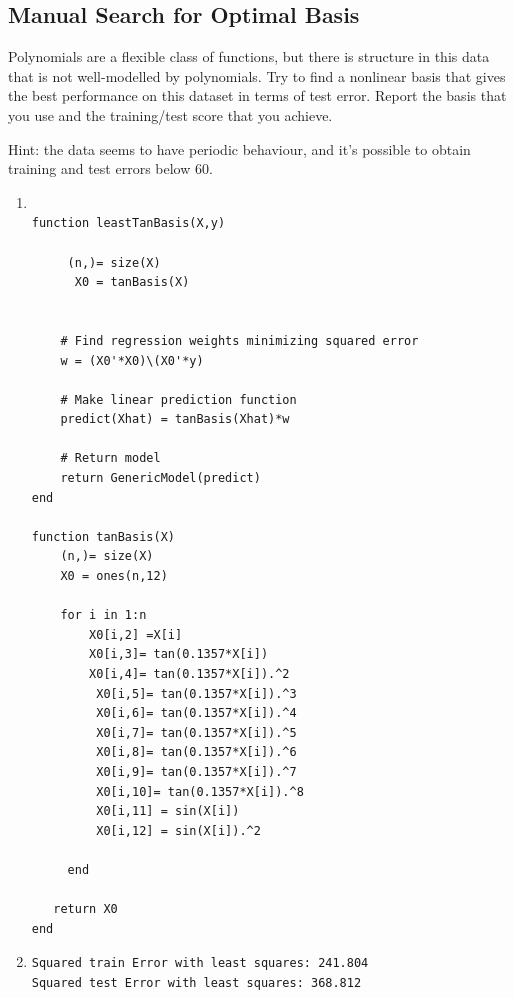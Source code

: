 \documentclass{article}
\def\blu#1{{\color{blu}#1}}
\begin{document}
\subsection{Manual Search for Optimal Basis}

Polynomials are a flexible class of functions, but there is structure in this data that is not well-modelled by polynomials. Try to find a nonlinear basis that gives the best performance on this dataset in terms of test error. \blu{Report the basis that you use and the training/test score that you achieve}.

Hint: the data seems to have periodic behaviour, and it's possible to obtain training and test errors below 60.

\begin{enumerate}
\item
 \begin{verbatim}

function leastTanBasis(X,y)

     (n,)= size(X)
      X0 = tanBasis(X)


    # Find regression weights minimizing squared error
    w = (X0'*X0)\(X0'*y)

    # Make linear prediction function
    predict(Xhat) = tanBasis(Xhat)*w

    # Return model
    return GenericModel(predict)
end

function tanBasis(X)
    (n,)= size(X)
    X0 = ones(n,12)

    for i in 1:n
        X0[i,2] =X[i]
        X0[i,3]= tan(0.1357*X[i])
        X0[i,4]= tan(0.1357*X[i]).^2
         X0[i,5]= tan(0.1357*X[i]).^3
         X0[i,6]= tan(0.1357*X[i]).^4
         X0[i,7]= tan(0.1357*X[i]).^5
         X0[i,8]= tan(0.1357*X[i]).^6
         X0[i,9]= tan(0.1357*X[i]).^7
         X0[i,10]= tan(0.1357*X[i]).^8
         X0[i,11] = sin(X[i])  
         X0[i,12] = sin(X[i]).^2  
         
     end 

   return X0
end

 \end{verbatim}


\item

  \begin{verbatim}
Squared train Error with least squares: 241.804
Squared test Error with least squares: 368.812
  \end{verbatim}

\end{enumerate}
\end{document}
